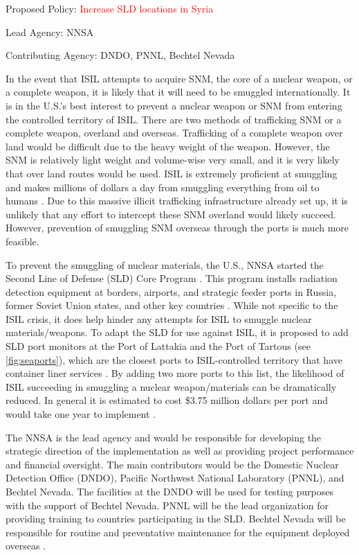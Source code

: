 \documentclass{report}
\begin{document}
Proposed Policy: \textcolor{red}{Increase SLD locations in Syria}

Lead Agency: NNSA

Contributing Agency: DNDO, PNNL, Bechtel Nevada \normalfont



In the event that ISIL attempts to acquire SNM, the core of a nuclear weapon, or a complete weapon, it is likely that it will need to be smuggled internationally. It is in the U.S.'s best interest to prevent a nuclear weapon or SNM from entering the controlled territory of ISIL. There are two methods of trafficking SNM or a complete weapon, overland and overseas. Trafficking of a complete weapon over land would be difficult due to the heavy weight of the weapon. However, the SNM is relatively light weight and volume-wise very small, and it is very likely that over land routes would be used. ISIL is extremely proficient at smuggling and makes millions of dollars a day from smuggling everything from oil to humans \cite{Amos2014}. Due to this massive illicit trafficking infrastructure already set up, it is unlikely that any effort to intercept these SNM overland would likely succeed. However, prevention of smuggling SNM overseas through the ports is much more feasible. 

To prevent the smuggling of nuclear materials, the U.S., NNSA started the Second Line of Defense (SLD) Core Program  \cite{Kilmartin2010}. This program installs radiation detection equipment at borders, airports, and strategic feeder ports in Russia, former Soviet Union states, and other key countries \cite{Kilmartin2010}. While not specific to the ISIL crisis, it does help hinder any attempts for ISIL to smuggle nuclear materials/weapons. To adapt the SLD for use against ISIL, it is proposed to add SLD port monitors at the Port of Lattakia and the Port of Tartous (see \autoref{fig:seaports}), which are the closest ports to ISIL-controlled territory that have container liner services \cite{WorldPortSource2005}.  By adding two more ports to this list, the likelihood of ISIL succeeding in smuggling a nuclear weapon/materials can be dramatically reduced. In general it is estimated to cost \$3.75 million dollars per port and would take one year to implement \cite{Aloise2005}. 

The NNSA is the lead agency and would be responsible for developing the strategic direction of the implementation as well as providing project performance and financial oversight. The main contributors would be the Domestic Nuclear Detection Office (DNDO), Pacific Northwest National Laboratory (PNNL), and Bechtel Nevada. The facilities at the DNDO will be used for testing purposes with the support of Bechtel Nevada. PNNL will be the lead organization for providing training to countries participating in the SLD. Bechtel Nevada will be responsible for routine and preventative maintenance for the equipment deployed overseas \cite{NationalNuclearSecurityAdministration2006}. 
\end{document}
